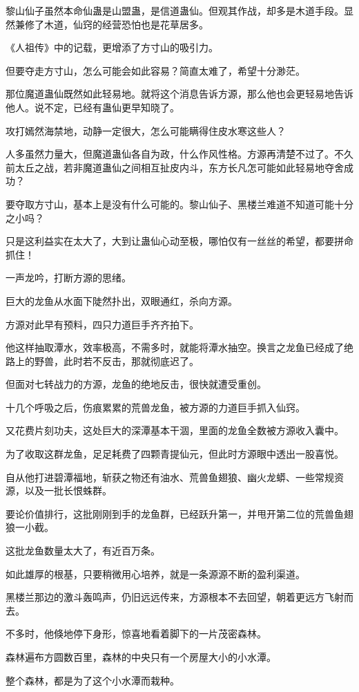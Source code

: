 \begin{this_body}
黎山仙子虽然本命仙蛊是山盟蛊，是信道蛊仙。但观其作战，却多是木道手段。显然兼修了木道，仙窍的经营恐怕也是花草居多。

《人祖传》中的记载，更增添了方寸山的吸引力。

但要夺走方寸山，怎么可能会如此容易？简直太难了，希望十分渺茫。

那位魔道蛊仙既然如此轻易地。就将这个消息告诉方源，那么他也会更轻易地告诉他人。说不定，已经有蛊仙更早知晓了。

攻打嫣然海禁地，动静一定很大，怎么可能瞒得住皮水寒这些人？

人多虽然力量大，但魔道蛊仙各自为政，什么作风性格。方源再清楚不过了。不久前太丘之战，若非魔道蛊仙之间相互扯皮内斗，东方长凡怎可能如此轻易地夺舍成功？

要夺取方寸山，基本上是没有什么可能的。黎山仙子、黑楼兰难道不知道可能十分之小吗？

只是这利益实在太大了，大到让蛊仙心动至极，哪怕仅有一丝丝的希望，都要拼命抓住！

一声龙吟，打断方源的思绪。

巨大的龙鱼从水面下陡然扑出，双眼通红，杀向方源。

方源对此早有预料，四只力道巨手齐齐拍下。

他这样抽取潭水，效率极高，不需多时，就能将潭水抽空。换言之龙鱼已经成了绝路上的野兽，此时若不反击，那就彻底迟了。

但面对七转战力的方源，龙鱼的绝地反击，很快就遭受重创。

十几个呼吸之后，伤痕累累的荒兽龙鱼，被方源的力道巨手抓入仙窍。

又花费片刻功夫，这处巨大的深潭基本干涸，里面的龙鱼全数被方源收入囊中。

为了收取这群龙鱼，足足耗费了四颗青提仙元，但此时方源眼中透出一股喜悦。

自从他打进碧潭福地，斩获之物还有油水、荒兽鱼翅狼、幽火龙蟒、一些常规资源，以及一批长恨蛛群。

要论价值排行，这批刚刚到手的龙鱼群，已经跃升第一，并甩开第二位的荒兽鱼翅狼一小截。

这批龙鱼数量太大了，有近百万条。

如此雄厚的根基，只要稍微用心培养，就是一条源源不断的盈利渠道。

黑楼兰那边的激斗轰鸣声，仍旧远远传来，方源根本不去回望，朝着更远方飞射而去。

不多时，他倏地停下身形，惊喜地看着脚下的一片茂密森林。

森林遍布方圆数百里，森林的中央只有一个房屋大小的小水潭。

整个森林，都是为了这个小水潭而栽种。


\end{this_body}
